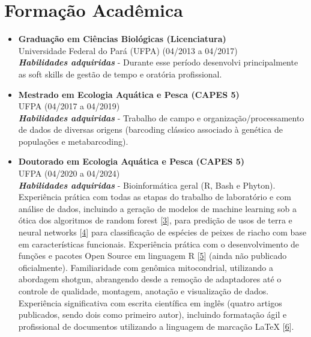 \documentclass[a4paper,10pt]{article}
\begin{document}
	\section*{Formação Acadêmica}
	\begin{itemize}[left=0pt]
		\item \textbf{Graduação em Ciências Biológicas (Licenciatura)}\\
		Universidade Federal do Pará (UFPA) (04/2013 a 04/2017)\\
		\textbf{\textit{Habilidades adquiridas}} - Durante esse período desenvolvi principalmente as soft skills de gestão de tempo e oratória profissional.
		
		\item \textbf{Mestrado em Ecologia Aquática e Pesca (CAPES 5)}\\
		UFPA (04/2017 a 04/2019)\\
		\textbf{\textit{Habilidades adquiridas}} - Trabalho de campo e organização/processamento de dados de diversas origens (barcoding clássico associado à genética de populações e metabarcoding).
		
		\item \textbf{Doutorado em Ecologia Aquática e Pesca (CAPES 5)}\\
		UFPA (04/2020 a 04/2024)\\
		\textbf{\textit{Habilidades adquiridas}} - Bioinformática geral (R, Bash e Phyton). Experiência prática com todas as etapas do trabalho de laboratório e com análise de dados, incluindo a geração de modelos de machine learning sob a ótica dos algoritmos de random forest [\href{https://www.linkedin.com/feed/update/urn:li:activity:7147371811264000000/}{3}], para predição de usos de terra e neural networks [\href{https://github.com/fabricioA14/Neural_Networks_Tensorflow}{4}] para classificação de espécies de peixes de riacho com base em características funcionais. Experiência prática com o desenvolvimento de funções e pacotes Open Source em linguagem R [\href{https://github.com/fabricioA14/refDBdelimiter}{5}] (ainda não publicado oficialmente). Familiaridade com genômica mitocondrial, utilizando a abordagem shotgun, abrangendo desde a remoção de adaptadores até o controle de qualidade, montagem, anotação e visualização de dados. Experiência significativa com escrita científica em inglês (quatro artigos publicados, sendo dois como primeiro autor), incluindo formatação ágil e profissional de documentos utilizando a linguagem de marcação LaTeX [\href{https://github.com/fabricioA14/Curriculum_Vitae_LaTeX}{6}].
	\end{itemize}
	
\end{document}
